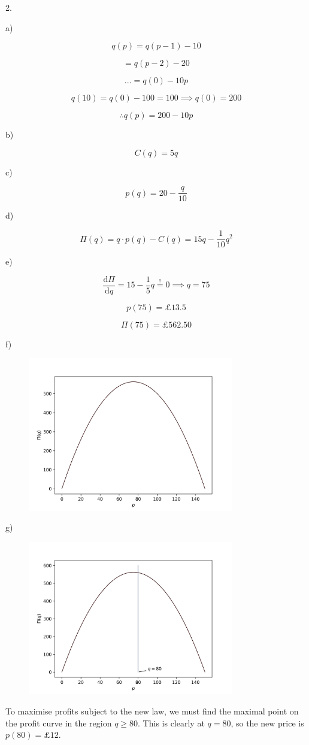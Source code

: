 \documentclass{article}
\newcommand{\dd}[1]{\mathrm{d}#1}
\begin{document}
2.

a)

$$
  q(p) = q(p-1) - 10
$$

$$
  = q(p-2) - 20
$$

$$
  ... = q(0) - 10p
$$

$$
  q(10) = q(0) - 100 = 100 \implies q(0) = 200
$$

$$
  \therefore q(p) = 200 - 10p
$$

b)

$$
  C(q) = 5q
$$

c)

$$
  p(q) = 20 - \frac{q}{10}
$$

d)

$$
  \Pi(q) = q\cdot p(q) - C(q) = 15q - \frac{1}{10}q^2
$$

e)

$$
  \frac{\dd \Pi}{\dd q} = 15 - \frac{1}{5}q \overset{!}{=} 0 \implies q = 75
$$

$$
  p(75) = \text{£}13.5
$$

$$
  \Pi(75) = \text{£}562.50
$$

f)

\begin{figure}[H]
  \centering
  \includegraphics[width=0.8\textwidth]{figures/5_Differentiation/LQ2f.png}
\end{figure}

g)

\begin{figure}[H]
  \centering
  \includegraphics[width=0.8\textwidth]{figures/5_Differentiation/LQ2g.png}
\end{figure}

To maximise profits subject to the new law, we must find the maximal point on the profit curve in the region $q\geq80$. This is clearly at $q=80$, so the new price is $p(80) = \text{£}12$.
\end{document}
